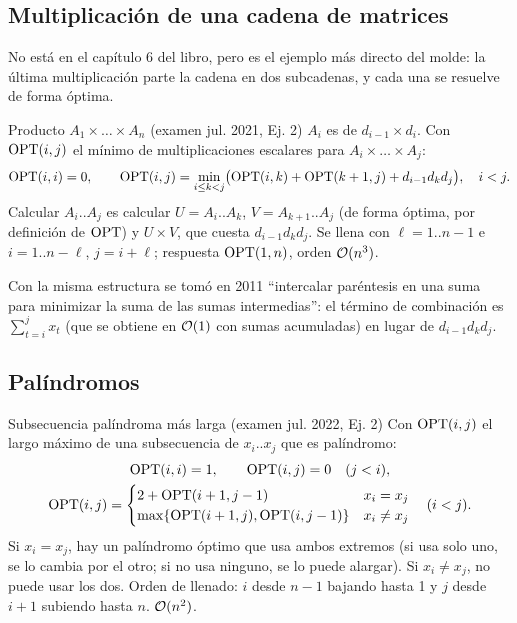 \subsection{Multiplicación de una cadena de matrices}

No está en el capítulo 6 del libro, pero es el ejemplo más directo del
molde: la última multiplicación parte la cadena en dos
subcadenas, y cada una se resuelve de forma óptima.

\begin{problema}{Producto $A_1\times\dots\times A_n$ (examen jul. 2021, Ej. 2)}
$A_i$ es de $d_{i-1}\times d_i$. Con $\mathrm{OPT}(i,j)$ el mínimo de
multiplicaciones escalares para $A_i\times\dots\times A_j$:
\[
\mathrm{OPT}(i,i)=0,\qquad \mathrm{OPT}(i,j)=\min_{i\le k<j}\bigl(\mathrm{OPT}(i,k)+\mathrm{OPT}(k+1,j)+d_{i-1}d_kd_j\bigr),\quad i<j.
\]
Calcular $A_i..A_j$ es calcular $U=A_i..A_k$, $V=A_{k+1}..A_j$ (de forma
óptima, por definición de $\mathrm{OPT}$) y $U\times V$, que cuesta
$d_{i-1}d_kd_j$. Se llena con $\ell=1..n-1$ e $i=1..n-\ell$, $j=i+\ell$;
respuesta $\mathrm{OPT}(1,n)$, orden $\mathcal{O}(n^3)$.
\end{problema}

Con la misma estructura se tomó en 2011 ``intercalar paréntesis en una suma
para minimizar la suma de las sumas intermedias'': el término de combinación
es $\sum_{t=i}^{j}x_t$ (que se obtiene en $\mathcal{O}(1)$ con sumas
acumuladas) en lugar de $d_{i-1}d_kd_j$.

\subsection{Palíndromos}

\begin{problema}{Subsecuencia palíndroma más larga (examen jul. 2022, Ej. 2)}
Con $\mathrm{OPT}(i,j)$ el largo máximo de una subsecuencia de $x_i..x_j$ que es
palíndromo:
\begin{gather*}
\mathrm{OPT}(i,i)=1,\qquad \mathrm{OPT}(i,j)=0\quad (j<i),\\
\mathrm{OPT}(i,j)=\begin{cases}2+\mathrm{OPT}(i+1,j-1) & x_i=x_j\\ \max\{\mathrm{OPT}(i+1,j),\mathrm{OPT}(i,j-1)\} & x_i\ne x_j\end{cases}\quad (i<j).
\end{gather*}
Si $x_i=x_j$, hay un palíndromo óptimo que usa ambos extremos (si usa solo
uno, se lo cambia por el otro; si no usa ninguno, se lo puede alargar). Si
$x_i\ne x_j$, no puede usar los dos. Orden de llenado: $i$ desde $n-1$
bajando hasta 1 y $j$ desde $i+1$ subiendo hasta $n$. $\mathcal{O}(n^2)$.
\end{problema}

